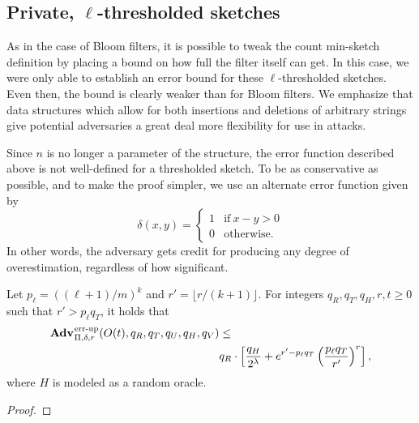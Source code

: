 \subsection{Private, $\ell$-thresholded sketches}

As in the case of Bloom filters, it is possible to tweak the count min-sketch
definition by placing a bound on how full the filter itself can get. In this
case, we were only able to establish an error bound for these $\ell$-thresholded
sketches. Even then, the bound is clearly weaker than for Bloom filters. We
emphasize that data structures which allow for both insertions and deletions of
arbitrary strings give potential adversaries a great deal more flexibility for
use in attacks.

Since $n$ is no longer a parameter of the structure, the error function
described above is not well-defined for a thresholded sketch. To be as
conservative as possible, and to make the proof simpler, we use an alternate
error function given by
\begin{equation}
  \delta(x, y) =
  \begin{cases}
    1 & \text{if}\ x - y > 0 \\
    0 & \text{otherwise.}
  \end{cases}
\end{equation}
In other words, the adversary gets credit for producing any degree of
overestimation, regardless of how significant.

\begin{theorem}\label{thm:scms-erreps-th}
Let $p_\ell = ((\ell+1)/m)^k$ and $r' = \lfloor r/(k+1) \rfloor$. For integers $q_R, q_T, q_H, r, t \geq 0$ such
that $r' > p_\ell q_T$, it holds that
  \begin{equation*}
  \begin{aligned}
    \Adv{\errep}_{\Pi,\delta,r}(O(t), q_R,q_T,q_U,q_H,q_V) &\leq \\
     & q_R \cdot \left[\frac{q_H}{2^\lambda} + e^{r'-p_\ell q_T}\left(\frac{p_\ell q_T}{r'}\right)^r\right],
  \end{aligned}
\end{equation*}
where $H$ is modeled as a random oracle.
\end{theorem}

\begin{proof}
  
\end{proof}